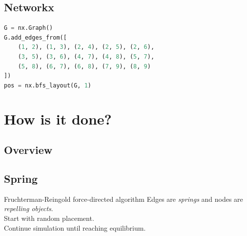 \documentclass[11pt]{beamer}
\begin{document}
\subsection{Networkx}
\begin{frame}{\subsecname}
\begin{figure}
\resizebox{0.8\textwidth}{!}{}
\end{figure}
\end{frame}

\begin{frame}[fragile]{\subsecname}
    \begin{block}{}
        \begin{lstlisting}[language=python]
G = nx.Graph()
G.add_edges_from([
    (1, 2), (1, 3), (2, 4), (2, 5), (2, 6),
    (3, 5), (3, 6), (4, 7), (4, 8), (5, 7),
    (5, 8), (6, 7), (6, 8), (7, 9), (8, 9)
])
pos = nx.bfs_layout(G, 1)
        \end{lstlisting}
    \end{block}
\end{frame}

\section{How is it done?}

\subsection{Overview}
\begin{frame}{\subsecname}
\end{frame}

\subsection{Spring}
\begin{frame}{\subsecname}

    \begin{block}{Fruchterman-Reingold force-directed algorithm}
        Edges are \textit{springs} and nodes are \textit{repelling objects}.\\
        Start with random placement.\\
        Continue simulation until reaching equilibrium.
    \end{block}

\end{frame}
\end{document}
